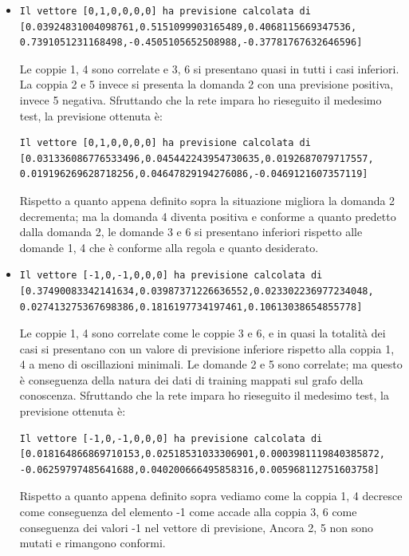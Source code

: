 \begin{itemize}
\item \begin{verbatim}Il vettore [0,1,0,0,0,0] ha previsione calcolata di
[0.03924831004098761,0.5151099903165489,0.4068115669347536,
0.7391051231168498,-0.4505105652508988,-0.37781767632646596]
\end{verbatim}
Le coppie 1, 4 sono correlate e 3, 6 si presentano quasi in tutti i casi inferiori. La coppia 2 e 5 invece si presenta la domanda 2 con una previsione positiva, invece 5 negativa.
Sfruttando che la rete impara ho rieseguito il medesimo test, la previsione ottenuta \`e:
\begin{verbatim}
Il vettore [0,1,0,0,0,0] ha previsione calcolata di
[0.031336086776533496,0.045442243954730635,0.0192687079717557,
0.019196269628718256,0.04647829194276086,-0.0469121607357119]
\end{verbatim}
Rispetto a quanto appena definito sopra la situazione migliora la domanda 2 decrementa; ma la domanda 4 diventa positiva e conforme a quanto predetto dalla domanda 2, le domande 3 e 6 si presentano inferiori rispetto alle domande 1, 4 che \`e conforme alla regola e quanto desiderato.
\item \begin{verbatim}
Il vettore [-1,0,-1,0,0,0] ha previsione calcolata di
[0.37490083342141634,0.03987371226636552,0.023302236977234048,
0.027413275367698386,0.1816197734197461,0.10613038654855778]
\end{verbatim}
Le coppie 1, 4 sono correlate come le coppie 3 e 6, e in quasi la totalit\`a dei casi si presentano con un valore di previsione inferiore rispetto alla coppia 1, 4 a meno di oscillazioni minimali. Le domande 2 e 5 sono correlate; ma questo \`e conseguenza della natura dei dati di training mappati sul grafo della conoscenza.
Sfruttando che la rete impara ho rieseguito il medesimo test, la previsione ottenuta \`e:
\begin{verbatim}
Il vettore [-1,0,-1,0,0,0] ha previsione calcolata di
[0.018164866869710153,0.02518531033306901,0.0003981119840385872,
-0.06259797485641688,0.040200666495858316,0.005968112751603758]
\end{verbatim}
Rispetto a quanto appena definito sopra vediamo come la coppia 1, 4 decresce come conseguenza del elemento -1 come accade alla coppia 3, 6 come conseguenza dei valori -1 nel vettore di previsione, Ancora 2, 5 non sono mutati e rimangono conformi.


\end{itemize}
